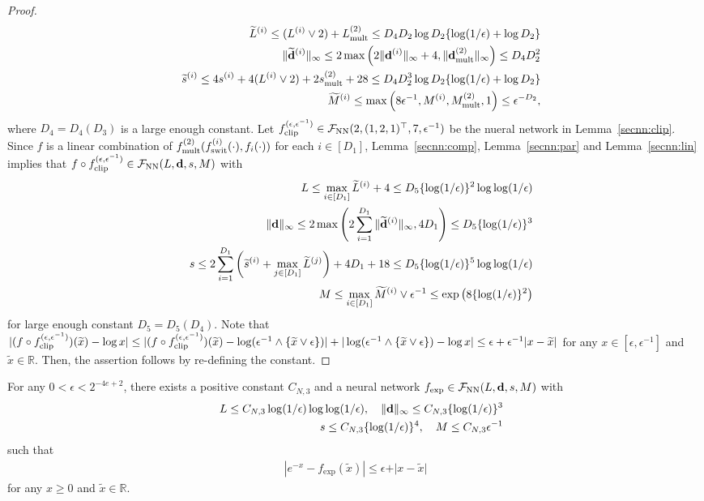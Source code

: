 \documentclass[twoside,11pt]{article}
\def\cF{\mathcal F}
\newcommand{\bd}{{\bf d}}
\newcommand{\bbR}{{\mathbb R}}
\newcommand{\bean}{\setlength\arraycolsep{1pt}\begin{eqnarray*}}
\newcommand{\eean}{\end{eqnarray*}}
\begin{document}
\begin{proof}
\bean
&& \widetilde L^{(i)} \leq (L^{(i)} \vee 2) + L_{\rm mult}^{(2)} \leq D_4 D_2 \log D_2  \{ \log (1/\epsilon) + \log D_2 \} 
\\
&& \| \widetilde \bd^{(i)} \|_{\infty} \leq 2\max \left( 2\|\bd^{(i)}\|_{\infty} + 4 ,  \|\bd_{\rm mult}^{(2)}\|_{\infty}   \right) \leq D_4 D_2^2
\\
&& \widetilde s^{(i)} \leq 4 s^{(i)} + 4 (L^{(i)} \vee 2) + 2 s_{\rm mult}^{(2)} + 28  \leq D_4 D_2^{3}\log D_2  \{ \log (1/\epsilon) + \log D_2 \} 
\\
&& \widetilde M^{(i)} \leq \max\left(8\epsilon^{-1}, M^{(i)}, M_{\rm mult}^{(2)}, 1 \right) \leq \epsilon^{-D_2},
\eean
where $D_4 = D_4(D_3)$ is a large enough constant.
Let $f_{\rm clip}^{(\epsilon,\epsilon^{-1})} \in \cF_{\rm NN}(2,(1,2,1)^{\top}, 7,\epsilon^{-1})$ be the nueral network in Lemma~\ref{secnn:clip}.
Since $f$ is a linear combination of $f_{\rm mult}^{(2)}(f_{\rm swit}^{(i)}(\cdot) , f_{i}(\cdot))$ for each $i \in [D_1]$, Lemma~\ref{secnn:comp}, Lemma~\ref{secnn:par} and Lemma~\ref{secnn:lin} implies that $f \circ f_{\rm clip}^{(\epsilon,\epsilon^{-1})} \in \cF_{\rm NN}(L,\bd,s,M)$ with
\bean
&& L \leq \max_{i \in [D_1]} \widetilde L^{(i)} + 4 \leq D_5 \{ \log(1/\epsilon)\}^{2} \log \log (1/\epsilon)
\\
&& \|\bd\|_{\infty} \leq 2\max\left( 2\sum_{i=1}^{D_1} \| \widetilde \bd^{(i)}\|_{\infty}, 4 D_1 \right) \leq D_5  \{ \log(1/\epsilon)\}^{3}
\\
&& s \leq 2\sum_{i=1}^{D_1}\left(\widetilde s^{(i)} +  \max_{j \in [D_1]} \widetilde L^{(j)} \right) + 4D_1 + 18 \leq D_5  \{ \log(1/\epsilon)\}^{5} \log \log (1/\epsilon)
\\
&& M \leq \max_{i \in [D_1]} \widetilde M^{(i)} \vee \epsilon^{-1} \leq \exp \left( 8 \{\log (1/\epsilon) \}^{2} \right)
\eean
for large enough constant $D_5 = D_5(D_4)$.
Note that $\vert (f \circ f_{\rm clip}^{(\epsilon,\epsilon^{-1})})(\widetilde x) - \log x \vert \leq \vert (f \circ f_{\rm clip}^{(\epsilon,\epsilon^{-1})})(\widetilde x) - \log ( \epsilon^{-1} \wedge \{\widetilde x \vee \epsilon\}) \vert + \vert \log ( \epsilon^{-1} \wedge \{\widetilde x \vee \epsilon\}) - \log x \vert \leq \epsilon + \epsilon^{-1} \vert x-\widetilde x\vert$ for any $x \in [\epsilon,\epsilon^{-1}]$ and $\widetilde x \in \bbR$.
Then, the assertion follows by re-defining the constant.
\end{proof}

\begin{lemma}
\label{secnn:exp}
For any $0 < \epsilon < 2^{-4e+2}$, there exists a positive constant $C_{N,3}$ and a neural network $f_{\exp} \in \cF_{\rm NN}(L,\bd,s,M)$ with
\bean
&& L \leq C_{N,3} \log(1/\epsilon) \log \log (1/\epsilon), \quad \|\bd\|_{\infty} \leq C_{N,3}  \{ \log(1/\epsilon)\}^{3}
\\
&& s \leq C_{N,3}  \{ \log(1/\epsilon)\}^{4}, \quad M \leq C_{N,3} \epsilon^{-1}
\eean
such that
\bean
\left\vert e^{-x} - f_{\exp}(\widetilde x) \right\vert \leq \epsilon + \vert x-\widetilde x\vert
\eean
for any $x \geq 0$ and $\widetilde x \in \bbR$.
\end{lemma}
\end{document}
